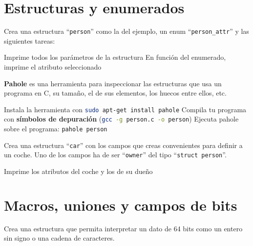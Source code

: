 \documentclass{tareas}
\begin{document}
\maketitle
\newpage
\tableofcontents
{}
\newpage

\section{Estructuras y enumerados}
\begin{problem}[Person]
\begin{statement}
	Crea una estructura ``\texttt{person}'' como la del ejemplo, un enum
	``\texttt{person\_attr}'' y las siguientes tareas:

	\subp Imprime todos los parámetros de la estructura
	\subp En función del enumerado, imprime el atributo seleccionado
\end{statement}
\end{problem}

\begin{problem}[Pahole]
\begin{statement}
	\textbf{Pahole} es una herramienta para inspeccionar las estructuras que
	usa un programa en C, su tamaño, el de sus elementos, los huecos entre
	ellos, etc.

	\subp Instala la herramienta con \lstinline[language=sh]|sudo apt-get install pahole|
	\subp Compila tu programa con \textbf{símbolos de depuración}
	(\lstinline[language=sh]|gcc -g person.c -o person|)
	\subp Ejecuta pahole sobre el programa: \lstinline[language=sh]|pahole person|
\end{statement}
\end{problem}


\begin{problem}[Car]
\begin{statement}
	Crea una estructura ``\texttt{car}'' con los campos que creas
	convenientes para definir a un coche. Uno de los campos ha de ser
	``\texttt{owner}'' del tipo ``\texttt{struct person}''.

	\subp Imprime los atributos del coche y los de su dueño
\end{statement}
\end{problem}

\clearpage
\section{Macros, uniones y campos de bits}
\begin{problem}
\begin{statement}
	Crea una estructura que permita interpretar un dato de 64 bits como un
	entero sin signo o una cadena de caracteres.
\end{statement}
\end{problem}
\end{document}
